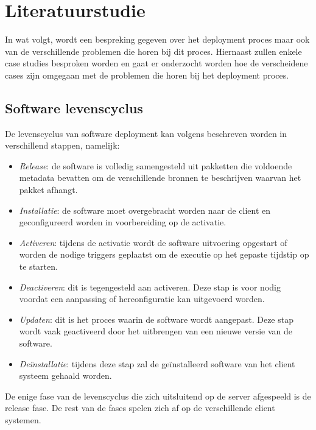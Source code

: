 \chapter{Literatuurstudie}
In wat volgt, wordt een bespreking gegeven over het deployment proces maar ook van de verschillende problemen die horen bij dit proces.
Hiernaast zullen enkele case studies besproken worden en gaat er onderzocht worden hoe de verscheidene cases zijn omgegaan met de problemen die horen bij het deployment proces. 

\section{Software levenscyclus}\label{sec:softwareLevenscyclus}
De levenscyclus van software deployment kan volgens \citet{softwareDeployment,hall1999cooperative} beschreven worden in verschillend stappen, namelijk:
\begin{itemize}
\item \emph{Release}: de software is volledig samengesteld uit pakketten die voldoende metadata bevatten om de verschillende bronnen te beschrijven waarvan het pakket afhangt.
\item \emph{Installatie}: de software moet overgebracht worden naar de client en geconfigureerd worden in voorbereiding op de activatie.
\item \emph{Activeren}: tijdens de activatie wordt de software uitvoering opgestart of worden de nodige triggers geplaatst om de executie op het gepaste tijdstip op te starten.
\item \emph{Deactiveren}: dit is tegengesteld aan activeren. Deze stap is voor nodig voordat een aanpassing of herconfiguratie kan uitgevoerd worden.
\item \emph{Updaten}: dit is het proces waarin de software wordt aangepast. Deze stap wordt vaak geactiveerd door het uitbrengen van een nieuwe versie van de software.
\item \emph{Deïnstallatie}: tijdens deze stap zal de geïnstalleerd software van het client systeem gehaald worden.
\end{itemize}
De enige fase van de levenscyclus die zich uitsluitend op de server afgespeeld is de release fase.
De rest van de fases spelen zich af op de verschillende client systemen.

